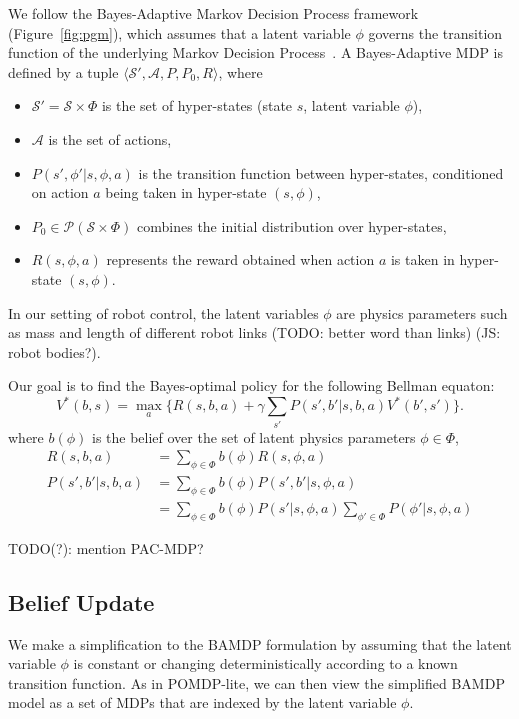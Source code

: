 \documentclass{article}
\newcommand{\figref}[1]{Figure~\ref{#1}}%
\begin{document}
We follow the Bayes-Adaptive Markov Decision Process framework (\figref{fig:pgm}), which assumes that a latent variable $\phi$ governs the transition function of the underlying Markov Decision Process~\cite{ghavamzadeh2015bayesian, ross2008bayes, guez2012efficient}.
A Bayes-Adaptive MDP is defined by a tuple $\langle \mathcal{S}', \mathcal{A}, P, P_0, R \rangle$, where
\begin{itemize}
\item $\mathcal{S'} = \mathcal{S}\times \Phi$ is the set of hyper-states (state $s$, latent variable $\phi$),
\item $\mathcal{A}$ is the set of actions,
\item $P(s',\phi'|s, \phi, a)$ is the transition function between hyper-states, conditioned
on action $a$ being taken in hyper-state $(s, \phi)$,
\item $P_0\in \mathcal{P}(\mathcal{S} \times \Phi)$ combines the initial distribution over hyper-states,
\item $R(s, \phi, a)$ represents the reward obtained when action $a$ is
taken in hyper-state $(s,\phi)$.
\end{itemize}
In our setting of robot control, the latent variables $\phi$ are physics parameters such as mass and length of different robot links (TODO: better word than links) (JS: robot bodies?).

Our goal is to find the Bayes-optimal policy for the following Bellman equaton:
\begin{equation}\label{eq:rl}
V^*(b, s) = \max_a \bigg\{R(s, b, a) + \gamma \sum_{s'}P(s', b'|s, b, a)V^*(b', s') \bigg\}.
\end{equation}
where $b(\phi)$ is the belief over the set of latent physics parameters $\phi \in \Phi$,
\begin{align*}
R(s, b, a)
  &= \sum_{\phi \in \Phi} b(\phi) R(s, \phi, a) \\
P(s', b' | s, b, a)
  &= \sum_{\phi \in \Phi} b(\phi) P(s', b' | s, \phi, a) \\
  &= \sum_{\phi \in \Phi} b(\phi) P(s' | s, \phi, a) \sum_{\phi' \in \Phi} P(\phi' | s, \phi, a)
\end{align*}

TODO(?): mention PAC-MDP?

\subsection{Belief Update}

We make a simplification to the BAMDP formulation by assuming that the latent variable $\phi$ is constant or changing deterministically according to a known transition function.
As in POMDP-lite\cite{chen2016pomdp}, we can then view the simplified BAMDP model as a set of MDPs that are indexed by the latent variable $\phi$.
\end{document}

